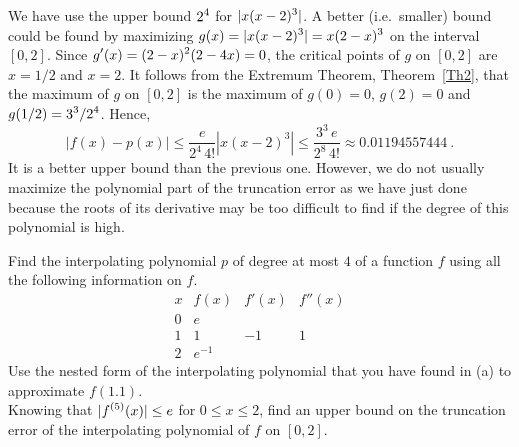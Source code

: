 {We have use the upper bound $\displaystyle 2^4$ for
$\displaystyle |x(x-2)^3|$.  A better
(i.e.\ smaller) bound could be found by maximizing
$\displaystyle g(x) = |x(x-2)^3| = x(2-x)^3$ on the interval $[0,2]$.
Since $\displaystyle g'(x) = (2-x)^2(2-4x)=0$, the critical points of
$g$ on $[0,2]$ are $x=1/2$ and $x=2$.  It follows from the Extremum Theorem,
Theorem~\ref{Th2}, that the maximum of $g$ on $[0,2]$ is the maximum
of $g(0) = 0$, $g(2)=0$ and $\displaystyle g(1/2) = 3^3/2^4$. 
Hence,
\[
| f(x) - p(x) | \leq \frac{e}{2^4\,4!} \left| x (x-2)^3 \right|
\leq \frac{3^3\,e}{2^8\,4!}
\approx 0.01194557444 \ .
\]
It is a better upper bound than the previous one.  However, we do not
usually maximize the polynomial part of the truncation error as we
have just done because the roots of its derivative may be too
difficult to find if the degree of this polynomial is high.
}

\begin{question}
 Find the interpolating polynomial $p$ of degree at most $4$
of a function $f$ using all the following information on $f$.
\[
\begin{array}{c|c|c|c}
x & f(x) & f'(x) & f''(x) \\
\hline
0 & e & & \\
1 & 1 & -1 & 1 \\
2 & e^{-1} & &
\end{array}
\]
 Use the nested form of the interpolating polynomial that you
have found in (a) to approximate $f(1.1)$.\\
 Knowing that $\displaystyle |f^{(5)}(x)| \leq e$ for
$0\leq x\leq 2$, find
an upper bound on the truncation error of the interpolating polynomial
of $f$ on $[0,2]$.
\end{question}


